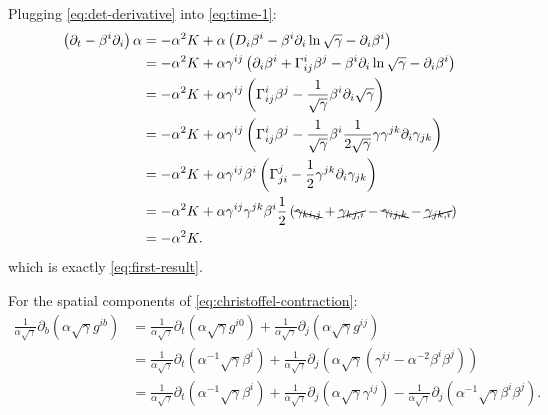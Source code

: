 \documentclass[aps,prd,preprint]{revtex4-1}
\begin{document}
Plugging \eqref{eq:det-derivative} into \eqref{eq:time-1}:
\begin{align}
  \left( \partial_t - \beta^i \partial_i \right) \alpha & =
    - \alpha^2 K + \alpha \left(
      D_i \beta^i
      - \beta^i \partial_i \ln \sqrt{\gamma}
      - \partial_i \beta^i \right) \\
  & =
    - \alpha^2 K + \alpha \gamma^{ij} \left(
        \partial_i \beta^i + \Gamma^i_{ij} \beta^j
        - \beta^i \partial_i \ln \sqrt{\gamma}
        - \partial_i \beta^i \right) \\
  & =
    - \alpha^2 K + \alpha \gamma^{ij} \left(
        \Gamma^i_{ij} \beta^j
        - \frac{1}{\sqrt{\gamma}}
          \beta^i \partial_i \sqrt{\gamma} \right) \\
  & =
    - \alpha^2 K + \alpha \gamma^{ij} \left(
        \Gamma^i_{ij} \beta^j
        - \frac{1}{\sqrt{\gamma}}
          \beta^i \frac{1}{2 \sqrt{\gamma}}
          \gamma \gamma^{jk} \partial_i \gamma_{jk} \right) \\
  & =
    - \alpha^2 K + \alpha \gamma^{ij} \beta^i \left(
        \Gamma^j_{ji}
      - \frac{1}{2} \gamma^{jk} \partial_i \gamma_{jk} \right) \\
  & =
    - \alpha^2 K + \alpha \gamma^{ij} \gamma^{jk} \beta^i \frac{1}{2} \left(
      \bcancel{\gamma_{ki,j}} + \cancel{\gamma_{kj,i}}
      - \bcancel{\gamma_{ij,k}} - \cancel{\gamma_{jk,i}} \right) \\
  & = -\alpha^2 K.
\end{align}
which is exactly \eqref{eq:first-result}.

For the spatial components of \eqref{eq:christoffel-contraction}:
\begin{align}
  \frac{1}{\alpha \sqrt{\gamma}} \partial_b (
    \alpha \sqrt{\gamma} g^{ib} ) & =
    \frac{1}{\alpha \sqrt{\gamma}} \partial_t (
      \alpha \sqrt{\gamma} g^{i0} )
    + \frac{1}{\alpha \sqrt{\gamma}} \partial_j (
      \alpha \sqrt{\gamma} g^{ij} ) \\
  & =
    \frac{1}{\alpha \sqrt{\gamma}} \partial_t (
      \alpha^{-1} \sqrt{\gamma} \beta^i )
    + \frac{1}{\alpha \sqrt{\gamma}} \partial_j \left(
      \alpha \sqrt{\gamma} \left(
        \gamma^{ij} - \alpha^{-2} \beta^i \beta^j \right) \right) \\
  & =
    \frac{1}{\alpha \sqrt{\gamma}} \partial_t (
      \alpha^{-1} \sqrt{\gamma} \beta^i )
    + \frac{1}{\alpha \sqrt{\gamma}} \partial_j \left(
    \alpha \sqrt{\gamma} \gamma^{ij} \right)
    - \frac{1}{\alpha \sqrt{\gamma}} \partial_j \left(
      \alpha^{-1} \sqrt{\gamma} \beta^i \beta^j \right).
      \label{eq:three-terms}
\end{align}
\end{document}
